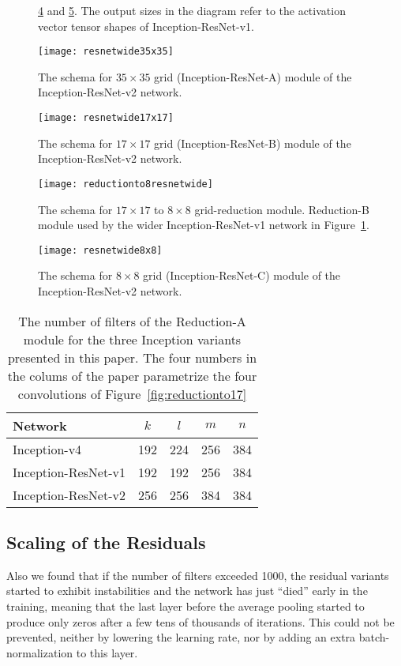 \documentclass[10pt,twocolumn,letterpaper]{article}
\begin{document}
\begin{figure}
{  \ref{fig:reductionto8resnetwide} and \ref{fig:resnetwide8x8module}.
  The output sizes in the diagram refer to the activation vector tensor shapes of
  Inception-ResNet-v1.
}
\label{fig:resnetsmallschema}
\end{figure}\clearpage\begin{figure}
\centering
\texttt{[image: resnetwide35x35]}\caption{The schema for
  $35\times 35$ grid (Inception-ResNet-A) module of the Inception-ResNet-v2 network.}
\label{fig:resnetwide35x35module}
\end{figure}\begin{figure}
\centering
\texttt{[image: resnetwide17x17]}
\caption{The schema for $17\times 17$ grid (Inception-ResNet-B) module of the
  Inception-ResNet-v2  network.}
\label{fig:resnetwide17x17module}
\end{figure}\begin{figure}
\centering
\texttt{[image: reductionto8resnetwide]}
\caption{The schema for $17\times 17$ to $8\times 8$ grid-reduction module.
  Reduction-B module used by the wider Inception-ResNet-v1 network
  in Figure~\ref{fig:resnetsmallschema}.
}
\label{fig:reductionto8resnetwide}
\end{figure}\begin{figure}
\centering
\texttt{[image: resnetwide8x8]}
\caption{The schema for $8\times 8$ grid  (Inception-ResNet-C) module of the
 Inception-ResNet-v2 network.}
\label{fig:resnetwide8x8module}
\end{figure}\begin{table}{\small
 \begin{center}
   \begin{tabular}[H]{|l|c|c|c|c|}
   \hline
   {\bf Network} & {$k$} & {$l$} & {$m$} & {$n$} \\
   \hline
   Inception-v4 & 192 & 224 & 256 & 384 \\
   Inception-ResNet-v1 & 192 & 192 & 256 & 384 \\
   Inception-ResNet-v2 & 256 & 256 & 384 & 384 \\
   \hline
   \end{tabular}
 \end{center}
 }
\caption{The number of filters of the Reduction-A module for the three
  Inception variants presented in this paper. The four numbers in the
  colums of the paper parametrize the four convolutions of Figure~\ref{fig:reductionto17} }
\label{reductionto17params}
\end{table}\subsection{Scaling of the Residuals}
Also we found that if the number of filters exceeded 1000, the residual
variants started to exhibit instabilities and the network has just
``died'' early in the training, meaning that the last layer before the
average pooling started to produce only zeros after a few tens of thousands of
iterations. This could not be prevented, neither by lowering the learning
rate, nor by adding an extra batch-normalization to this layer.
\end{document}
